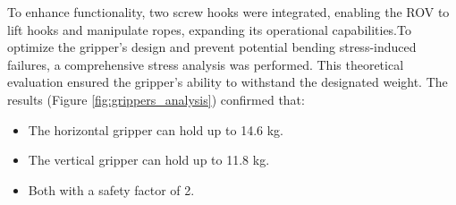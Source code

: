 To enhance functionality, two screw hooks were integrated, enabling the ROV to lift hooks and manipulate ropes, expanding its operational capabilities.To optimize the gripper’s design and prevent potential bending stress-induced failures, a comprehensive stress analysis was performed. This theoretical evaluation ensured the gripper’s ability to withstand the designated weight. The results (Figure \ref{fig:grippers_analysis}) confirmed that:

\vspace{-0.5\baselineskip}
\begin{itemize}
    \setlength{\itemsep}{0pt}
    \item The horizontal gripper can hold up to 14.6 kg.
    \item The vertical gripper can hold up to 11.8 kg.
    \item Both with a safety factor of 2.
\end{itemize}

